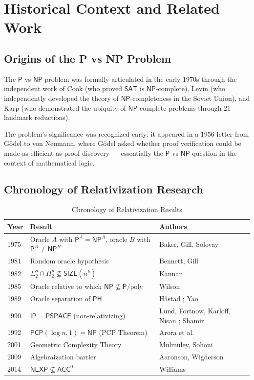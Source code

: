 \documentclass[11pt,a4paper]{article}
\theoremstyle{plain}
\theoremstyle{definition}
\theoremstyle{remark}
\newcommand{\PP}{\mathsf{P}}
\newcommand{\NP}{\mathsf{NP}}
\newcommand{\PSPACE}{\mathsf{PSPACE}}
\newcommand{\NEXP}{\mathsf{NEXP}}
\newcommand{\PH}{\mathsf{PH}}
\newcommand{\IP}{\mathsf{IP}}
\newcommand{\ACC}{\mathsf{ACC}}
\newcommand{\PCP}{\mathsf{PCP}}
\newcommand{\SIZE}{\mathsf{SIZE}}
\newcommand{\poly}{\mathrm{poly}}
\newcommand{\SAT}{\mathsf{SAT}}
\begin{document}
\section{Historical Context and Related Work}\label{sec:history}

\subsection{Origins of the P vs NP Problem}

The $\PP$ vs $\NP$ problem was formally articulated in the early 1970s through
the independent work of Cook \cite{Cook71} (who proved $\SAT$ is $\NP$-complete),
Levin \cite{Levin73} (who independently developed the theory of $\NP$-completeness
in the Soviet Union), and Karp \cite{Karp72} (who demonstrated the ubiquity of
$\NP$-complete problems through 21 landmark reductions).

The problem's significance was recognized early: it appeared in a 1956 letter
from G\"{o}del to von Neumann, where G\"{o}del asked whether proof verification
could be made as efficient as proof discovery — essentially the $\PP$ vs $\NP$
question in the context of mathematical logic.

\subsection{Chronology of Relativization Research}

\begin{table}[H]
\centering
\caption{Chronology of Relativization Results}
\label{tab:chronology}
\begin{tabular}{@{}p{}p{}p{}@{}}
\toprule
\textbf{Year} & \textbf{Result} & \textbf{Authors} \\
\midrule
1975 & Oracle $A$ with $\PP^A = \NP^A$, oracle $B$ with $\PP^B \neq \NP^B$ & Baker, Gill, Solovay \cite{BGS75} \\
1981 & Random oracle hypothesis & Bennett, Gill \cite{BG81} \\
1982 & $\Sigma_2^p \cap \Pi_2^p \not\subseteq \SIZE(n^k)$ & Kannan \cite{Kannan82} \\
1985 & Oracle relative to which $\NP \not\subseteq \PP/\poly$ & Wilson \cite{Wil85} \\
1989 & Oracle separation of $\PH$ & H\r{a}stad \cite{Hastad89}; Yao \cite{Yao85} \\
1990 & $\IP = \PSPACE$ (non-relativizing) & Lund, Fortnow, Karloff, Nisan \cite{LFKN92}; Shamir \cite{Shamir92} \\
1992 & $\PCP(\log n, 1) = \NP$ (PCP Theorem) & Arora et al. \cite{ALMSS98} \\
2001 & Geometric Complexity Theory & Mulmuley, Sohoni \cite{MS01} \\
2009 & Algebraization barrier & Aaronson, Wigderson \cite{AW09} \\
2014 & $\NEXP \not\subseteq \ACC^0$ & Williams \cite{Williams14} \\
\bottomrule
\end{tabular}
\end{table}
\end{document}
